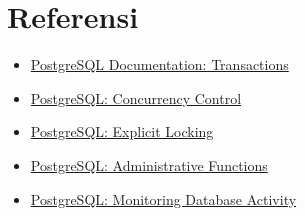\section{Referensi}

\begin{itemize}
    \item \href{https://www.postgresql.org/docs/current/transaction-iso.html}{PostgreSQL Documentation: Transactions}
    \item \href{https://www.postgresql.org/docs/current/mvcc.html}{PostgreSQL: Concurrency Control}
    \item \href{https://www.postgresql.org/docs/current/explicit-locking.html}{PostgreSQL: Explicit Locking}
    \item \href{https://www.postgresql.org/docs/current/functions-admin.html}{PostgreSQL: Administrative Functions}
    \item \href{https://www.postgresql.org/docs/current/monitoring-stats.html}{PostgreSQL: Monitoring Database Activity}
\end{itemize}